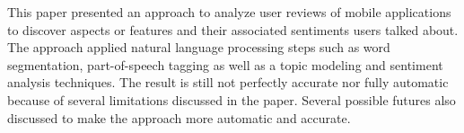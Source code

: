 This paper presented an approach to analyze user reviews of mobile applications to discover aspects or features and their associated sentiments users talked about. The approach applied natural language processing steps such as word segmentation, part-of-speech tagging as well as a topic modeling and sentiment analysis techniques. The result is still not perfectly accurate nor fully automatic because of several limitations discussed in the paper. Several possible futures also discussed to make the approach more automatic and accurate.
